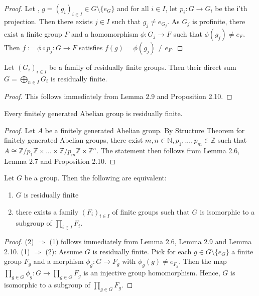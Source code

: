 \begin{proof}
Let , $g=(g_i)_{i \in I} \in G \setminus \{e_G \}$ and for all $i \in I$, let $p_i : G \rightarrow G_i$ be the i'th projection. Then there exists $j \in I$ such that $g_j \neq e_{G_j}$. As $G_j$ is profinite, there exist a finite group $F$ and a homomorphism $\phi : G_j \rightarrow F$ such that $\phi (g_j) \neq e_F$. Then $f := \phi \circ p_j: G \rightarrow F$ satisfies $f(g) = \phi(g_j) \neq e_F$.
\end{proof}

\begin{corollary}
Let $(G_i)_{ i \in I}$ be a family of residually finite groups. Then their direct sum $G = \bigoplus_{n \in I} G_i$ is residually finite.
\end{corollary}

\begin{proof}
This follows immediately from Lemma 2.9 and Proposition 2.10. 
\end{proof}

\begin{proposition}
Every finitely generated Abelian group is residually finite.
\end{proposition}

\begin{proof}
Let $A$ be a finitely generated Abelian group. By Structure Theorem for finitely generated Abelian groups, there exist $m,n \in \mathbb{N}, p_1,..., p_m \in \mathbb{Z}$ such that $A \cong \mathbb{Z}/p_1 \mathbb{Z} \times ... \times \mathbb{Z}/p_m \mathbb{Z} \times \mathbb{Z}^n$. The statement then follows from Lemma 2.6, Lemma 2.7 and Proposition 2.10.
\end{proof}

\begin{proposition}
Let $G$ be a group. Then the following are equivalent:
\begin{enumerate}
\item $G$ is residually finite
\item there exists a family $(F_i)_{i \in I}$ of finite groups such that $G$ is isomorphic to a subgroup of $\prod_{i \in I} F_i$.
\end{enumerate}

\end{proposition}

\begin{proof}
(2) $\Rightarrow$ (1) follows immediately from Lemma 2.6, Lemma 2.9 and Lemma 2.10. \newline
(1) $\Rightarrow$ (2): Assume $G$ is residually finite. Pick for each $g \in G \setminus \{e_G \}$ a finite group $F_g$ and a morphism $\phi_g: G \rightarrow F_g$ with $\phi_g (g) \neq e_{F_g}$. Then the map $\prod_{g \in G} \phi_g : G \rightarrow \prod_{g \in G} F_g$ is an injective group homomorphism. Hence, $G$ is isomorphic to a subgroup of  $\prod_{g \in G} F_g$.
\end{proof}


